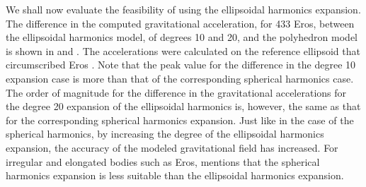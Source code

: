 We shall now evaluate the feasibility of using the ellipsoidal harmonics expansion. The difference in the computed gravitational acceleration, for 433 Eros, between the ellipsoidal harmonics model, of degrees 10 and 20, and the polyhedron model is shown in  and . The accelerations were calculated on the reference ellipsoid that circumscribed Eros \cite{spherical_ellipsoidal_comparison}. Note that the peak value for the difference in the degree 10 expansion case is more than that of the corresponding spherical harmonics case. The order of magnitude for the difference in the gravitational accelerations for the degree 20 expansion of the ellipsoidal harmonics is, however, the same as that for the corresponding spherical harmonics expansion. Just like in the case of the spherical harmonics, by increasing the degree of the ellipsoidal harmonics expansion, the accuracy of the modeled gravitational field has increased. For irregular and elongated bodies such as Eros, \cite{spherical_ellipsoidal_comparison} mentions that the spherical harmonics expansion is less suitable than the ellipsoidal harmonics expansion.
%

